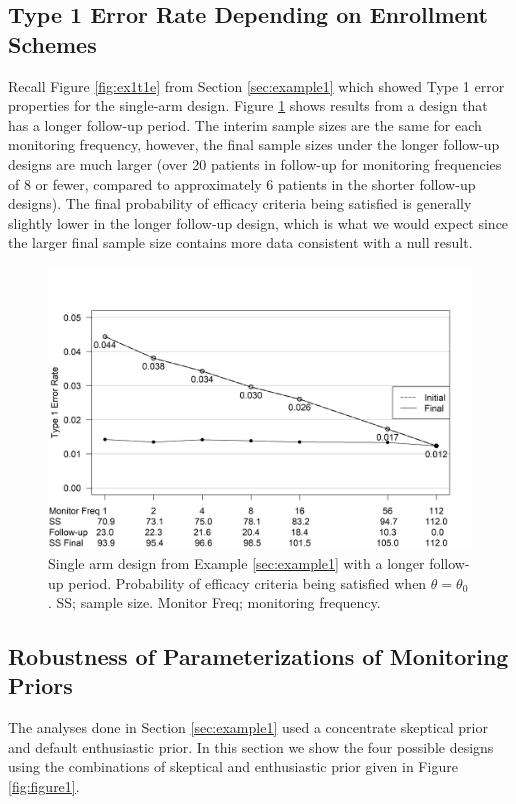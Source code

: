 \documentclass[useAMS,usenatbib,referee]{biom}
\begin{document}
\subsection{Type 1 Error Rate Depending on Enrollment Schemes}
Recall Figure \ref{fig:ex1t1e} from Section \ref{sec:example1} which showed Type 1 error properties for the single-arm design. Figure \ref{fig:ex1t1e_longer} shows results from a design that has a longer follow-up period. The interim sample sizes are the same for each monitoring frequency, however, the final sample sizes under the longer follow-up designs are much larger (over 20 patients in follow-up for monitoring frequencies of 8 or fewer, compared to approximately 6 patients in the shorter follow-up designs). The final probability of efficacy criteria being satisfied is generally slightly lower in the longer follow-up design, which is what we would expect since the larger final sample size contains more data consistent with a null result.
\begin{figure}\begin{center}

   \includegraphics[width=6in]{../00-paper/FIGURES/figureS1.png}
    \caption{Single arm design from Example \ref{sec:example1} with a longer follow-up period. Probability of efficacy criteria being satisfied when $\theta=\theta_0$. SS; sample size. Monitor Freq; monitoring frequency.}
	\label{fig:ex1t1e_longer}

\end{center}
\end{figure}
\subsection{Robustness of Parameterizations of Monitoring Priors}\label{sec:priorRobustness}
The analyses done in Section \ref{sec:example1} used a concentrate skeptical prior and default enthusiastic prior. In this section we show the four possible designs using the combinations of skeptical and enthusiastic prior given in Figure \ref{fig:figure1}.
\end{document}
